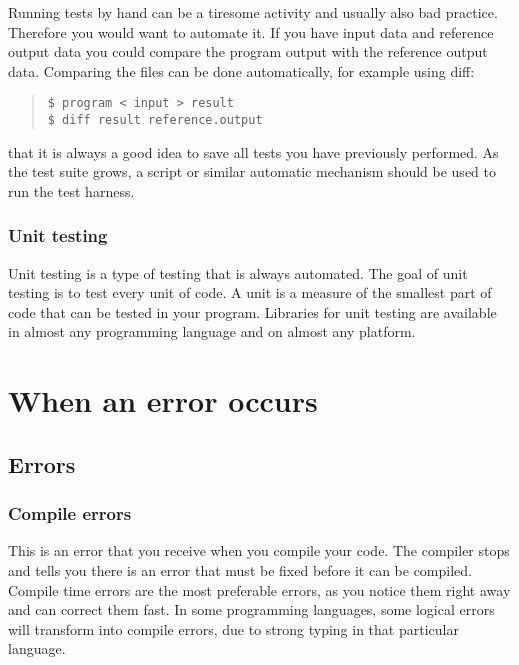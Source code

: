\documentclass[11pt,a4paper,twoside]{article}
\begin{document}
Running tests by hand can be a tiresome activity and usually also bad practice.
Therefore you would want to automate it. If you have input data and reference
output data you could compare the program output with the reference output
data. Comparing the files can be done automatically, for example using diff:

\begin{quote}
\begin{verbatim}
$ program < input > result
$ diff result reference.output 
\end{verbatim}
\end{quote}

 that it is always a good idea to save all tests you have
previously performed. As the test suite grows, a script or similar automatic
mechanism should be used to run the test harness. 

\subsubsection{Unit testing}

Unit testing is a type of testing that is always automated. The goal of unit
testing is to test every unit of code. A unit is a measure of the smallest part
of code that can be tested in your program. Libraries for unit testing are
available in almost any programming language and on almost any platform.


\section{When an error occurs}

\subsection{Errors}

\subsubsection{Compile errors}

This is an error that you receive when you compile your code. The compiler
stops and tells you there is an error that must be fixed before it can be
compiled. Compile time errors are the most preferable errors, as you notice
them right away and can correct them fast. In some programming languages, some
logical errors will transform into compile errors, due to strong typing in that
particular language. 
\end{document}
